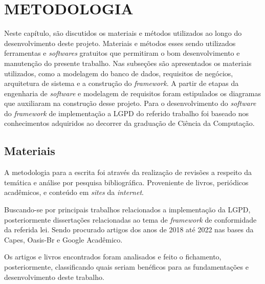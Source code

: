 \documentclass[
	12pt,				%
	openright,			%
	oneside,			%
	a4paper,			%
	english,			%
	french,				%
	spanish,			%
	brazil,				%
	]{abntex2}
\begin{document}

\chapter{METODOLOGIA}
\label{ch: materiais e métodos}

Neste capítulo, são discutidos os materiais e métodos utilizados ao longo do desenvolvimento deste projeto. Materiais e métodos esses sendo utilizados ferramentas e \textit{softwares} gratuitos que permitiram o bom desenvolvimento e manutenção do presente trabalho.
Nas subseções são apresentados os materiais utilizados, como a modelagem do banco de dados, requisitos de negócios, arquitetura de sistema e a construção do \textit{framework}. A partir de etapas da engenharia de \textit{software} e modelagem de requisitos foram estipulados os diagramas que auxiliaram na construção desse projeto.
Para o desenvolvimento do \textit{software} do \textit{framework} de implementação a LGPD do referido trabalho foi baseado nos conhecimentos adquiridos ao decorrer da graduação de Ciência da Computação.


\section{Materiais}

A metodologia para a escrita foi através da realização de revisões a respeito da temática e análise por pesquisa bibliográfica. Proveniente de livros, periódicos acadêmicos, e conteúdo em \textit{sites} da \textit{internet}.

Buscando-se por principais trabalhos relacionados a implementação da LGPD, posteriormente dissertações relacionadas ao tema de \textit{framework}  de conformidade da referida lei. Sendo procurado artigos dos anos de 2018 até 2022 nas bases da Capes, Oasis-Br e Google Acadêmico. 

Os artigos e livros encontrados foram analisados e feito o fichamento, posteriormente, classificando quais seriam benéficos para as fundamentações e desenvolvimento deste trabalho.

\end{document}

